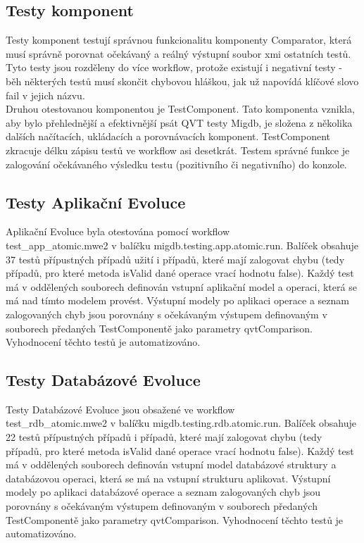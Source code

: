 \documentclass[11pt,twoside,a4paper]{book}
\begin{document}
\subsection{Testy komponent}
Testy komponent testují správnou funkcionalitu komponenty Comparator, která
musí správně porovnat očekávaný a reálný výstupní soubor xmi ostatních testů.
Tyto testy jsou rozděleny do více workflow, protože existují i negativní
testy - běh některých testů musí skončit chybovou hláškou, jak už napovídá
klíčové slovo fail v jejich názvu.\\

Druhou otestovanou komponentou je TestComponent. Tato komponenta vznikla, aby
bylo přehlednější a efektivnější psát QVT testy Migdb, je složena z několika
dalších načítacích, ukládacích a porovnávacích komponent. TestComponent zkracuje
délku zápisu testů ve workflow asi desetkrát. Testem správné funkce je
zalogování očekávaného výsledku testu (pozitivního či negativního) do konzole.

\subsection{Testy Aplikační Evoluce}
Aplikační Evoluce byla otestována pomocí workflow \\test\_app\_atomic.mwe2 v
balíčku migdb.testing.app.atomic.run. Balíček obsahuje 37 testů přípustných
případů užití i případů, které mají zalogovat chybu (tedy případů, pro které
metoda isValid dané operace vrací hodnotu false).
Každý test má v oddělených souborech definován vstupní aplikační model a
operaci, která se má nad tímto modelem provést. Výstupní modely po
aplikaci operace a seznam zalogovaných chyb jsou porovnány s očekávaným
výstupem definovaným v souborech předaných TestComponentě jako parametry
qvtComparison. Vyhodnocení těchto testů je automatizováno.

\subsection{Testy Databázové Evoluce}
Testy Databázové Evoluce jsou obsažené ve workflow \\test\_rdb\_atomic.mwe2 v
balíčku migdb.testing.rdb.atomic.run. Balíček obsahuje 22 testů přípustných
případů i případů, které mají zalogovat chybu (tedy případů, pro které
metoda isValid dané operace vrací hodnotu false).
Každý test má v oddělených souborech definován vstupní model databázové
struktury a databázovou operaci, která se má na vstupní strukturu aplikovat.
Výstupní modely po aplikaci databázové operace a seznam zalogovaných chyb jsou
porovnány s očekávaným výstupem definovaným v souborech předaných 
TestComponentě jako parametry qvtComparison. Vyhodnocení těchto testů je automatizováno.
\end{document}
